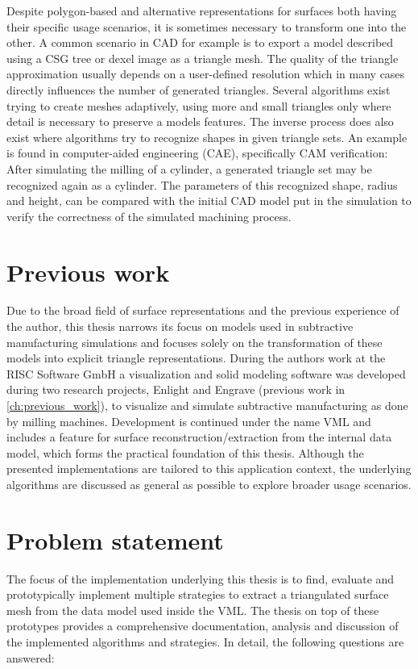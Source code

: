 Despite polygon-based and alternative representations for surfaces both having their specific usage scenarios, it is sometimes necessary to transform one into the other.
A common scenario in CAD for example is to export a model described using a CSG tree or dexel image as a triangle mesh.
The quality of the triangle approximation usually depends on a user-defined resolution which in many cases directly influences the number of generated triangles.
Several algorithms exist trying to create meshes adaptively, using more and small triangles only where detail is necessary to preserve a models features.
%
The inverse process does also exist where algorithms try to recognize shapes in given triangle sets.
An example is found in computer-aided engineering (CAE), specifically CAM verification: After simulating the milling of a cylinder, a generated triangle set may be recognized again as a cylinder. The parameters of this recognized shape, \eg radius and height, can be compared with the initial CAD model put in the simulation to verify the correctness of the simulated machining process.


\section{Previous work}

Due to the broad field of surface representations and the previous experience of the author, this thesis narrows its focus on models used in subtractive manufacturing simulations and focuses solely on the transformation of these models into explicit triangle representations.
During the authors work at the RISC Software GmbH a visualization and solid modeling software was developed during two research projects, Enlight and Engrave (\cf previous work in \cref{ch:previous_work}), to visualize and simulate subtractive manufacturing as done by milling machines.
Development is continued under the name VML and includes a feature for surface reconstruction/extraction from the internal data model, which forms the practical foundation of this thesis.
Although the presented implementations are tailored to this application context, the underlying algorithms are discussed as general as possible to explore broader usage scenarios.


\section{Problem statement}
\label{sec:problem}

The focus of the implementation underlying this thesis is to find, evaluate and prototypically implement multiple strategies to extract a triangulated surface mesh from the data model used inside the VML.
The thesis on top of these prototypes provides a comprehensive documentation, analysis and discussion of the implemented algorithms and strategies.
In detail, the following questions are answered:

